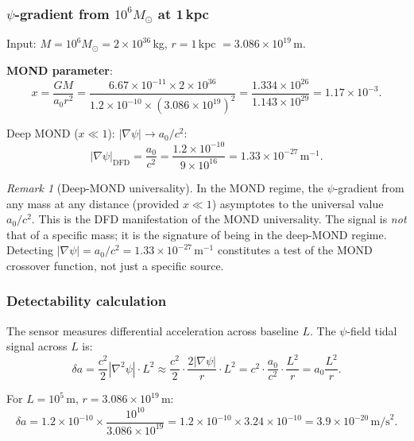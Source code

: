 \documentclass[11pt]{article}
\theoremstyle{definition}
\theoremstyle{remark}
\newtheorem{remark}[theorem]{Remark}
\begin{document}
\subsubsection{$\psi$-gradient from $10^6 M_\odot$ at 1\,kpc}

Input: $M = 10^6 M_\odot = 2\times10^{36}$\,kg, $r = 1$\,kpc $= 3.086\times10^{19}$\,m.

\textbf{MOND parameter}:
\begin{equation}
x = \frac{GM}{a_0 r^2}
= \frac{6.67\times10^{-11} \times 2\times10^{36}}
{1.2\times10^{-10} \times (3.086\times10^{19})^2}
= \frac{1.334\times10^{26}}{1.143\times10^{29}}
= 1.17\times10^{-3}.
\end{equation}

Deep MOND ($x \ll 1$): $|\nabla\psi| \to a_0/c^2$:
\begin{equation}
\boxed{|\nabla\psi|_{\mathrm{DFD}}
= \frac{a_0}{c^2}
= \frac{1.2\times10^{-10}}{9\times10^{16}}
= 1.33\times10^{-27}\,\mathrm{m}^{-1}.}
\label{eq:dm-gradient}
\end{equation}

\begin{remark}[Deep-MOND universality]
In the MOND regime, the $\psi$-gradient from any mass at any distance
(provided $x \ll 1$) asymptotes to the universal value $a_0/c^2$. This
is the DFD manifestation of the MOND universality. The signal is
\emph{not} that of a specific mass; it is the signature of being in the
deep-MOND regime. Detecting $|\nabla\psi| = a_0/c^2 = 1.33\times10^{-27}$\,m$^{-1}$
constitutes a test of the MOND crossover function, not just a specific
source.
\end{remark}

\subsubsection{Detectability calculation}

The sensor measures differential acceleration across baseline $L$. The
$\psi$-field tidal signal across $L$ is:
\begin{equation}
\delta a = \frac{c^2}{2} |\nabla^2\psi| \cdot L^2
\approx \frac{c^2}{2} \cdot \frac{2|\nabla\psi|}{r} \cdot L^2
= c^2 \cdot \frac{a_0}{c^2} \cdot \frac{L^2}{r}
= a_0 \frac{L^2}{r}.
\end{equation}

For $L = 10^5$\,m, $r = 3.086\times10^{19}$\,m:
\begin{equation}
\delta a = 1.2\times10^{-10} \times \frac{10^{10}}{3.086\times10^{19}}
= 1.2\times10^{-10} \times 3.24\times10^{-10}
= 3.9\times10^{-20}\,\mathrm{m/s}^2.
\end{equation}
\end{document}
